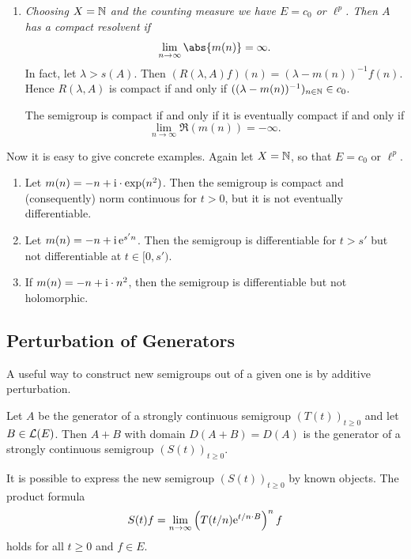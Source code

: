 \begin{example}
\begin{enumerate}[\upshape (i), wide, labelindent=.25em]
%
\[
	S(\theta + \pi/2) \subseteq \rho(A) .
\]
%
\begin{proof}
The condition is necessary by Theorem~\ref{thm:a2-1.12}.
Conversely, if\/ $S(\theta + \pi/2) \subset~\rho(A)$, then one verifies directly that 
\[
(T(z)f)(x) = \eu^{z \cdot m(x)}f(x) \quad (f \in E, x \in X) 
\]
defines a family $(T(z))_{z \in S(\theta)}$ of bounded operators satisfying conditions (i) and (ii)
of Definition~\ref{def:a2-1.11}.
\end{proof}
\item \label{ex:a2-1.28-4}
\textit{Choosing $X = \mathbb{N}$ and the counting measure we have $E = c_{0}$ or $\ell^{p}$.
Then $A$ has a compact resolvent if }
%
\[
	\lim_{n \to \infty} \abs{m(n)} = \infty .
\]
%
In fact, let $\lambda > s(A)$.
Then $(R(\lambda,A)f)(n) = (\lambda-m(n))^{-1}f(n)$.
Hence $R(\lambda,A)$ is compact if and only if\/ $((\lambda-m(n))^{-1})_{n \in \mathbb{N}} \in c_{0}$. 

The semigroup is compact if and only if it is eventually compact if and only if 
\[
\lim_{n \to \infty} \Re(m(n)) = -\infty.
\]
\end{enumerate}
Now it is easy to give concrete examples. 
Again let $X = \mathbb{N}$, so that $E = c_{0}$ or $\ell^{p}$.
\begin{enumerate}[\upshape(i)]%

\item
Let $m(n) = -n + \mathrm{i} \cdot \exp(n^{2})$.
Then the semigroup is compact and (consequently) norm continuous for $t > 0$, but it is not eventually differentiable.

\item
Let $m(n) = -n + \mathrm{i} \,\mathrm{e}^{s'n}$.
Then the semigroup is differentiable for $t > s'$ but not differentiable at $t \in [0,s')$.

\item
If\/ $m(n) = -n +\mathrm{i} \cdot n^2$, then the semigroup is differentiable but not holomorphic.

\end{enumerate}
\end{example}	

\subsection{Perturbation of Generators} \label{subsec:a2-1.se8}
A useful way to construct new semigroups out of a given one is by additive perturbation.%
\begin{theorem}\label{thm:a2-1.29}
Let $A$ be the generator of a strongly continuous semigroup $(T(t))_{t \geq 0}$ and let $B \in \mathcal{L}(E)$.
Then $A + B$ with domain $D(A+B) = D(A)$ is the generator of a strongly continuous semigroup $(S(t))_{t \geq 0}$.
\end{theorem}
It is possible to express the new semigroup $(S(t))_{t \geq 0}$ by known objects.
The product formula
\begin{equation}\label{eq:a2-1.8}
    S(t)f = \lim_{n \to \infty} \left( T(t/n)\mathrm{e}^{t/n \cdot B} \right)^{n} f
\end{equation}
holds for all $t \geq 0$ and $f \in E$.


